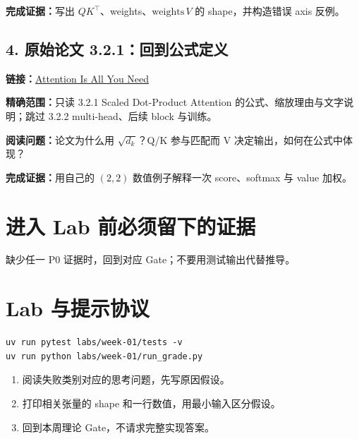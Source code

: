 \documentclass[11pt,a4paper]{article}
\begin{document}
\textbf{完成证据：}写出 $QK^\top$、weights、$\text{weights}\,V$ 的 shape，并构造错误 axis 反例。

\subsection{4. 原始论文 3.2.1：回到公式定义}
\textbf{链接：}\href{https://arxiv.org/abs/1706.03762}{Attention Is All You Need}

\textbf{精确范围：}只读 3.2.1 Scaled Dot-Product Attention 的公式、缩放理由与文字说明；跳过 3.2.2 multi-head、后续 block 与训练。

\textbf{阅读问题：}论文为什么用 $\sqrt{d_k}$？Q/K 参与匹配而 V 决定输出，如何在公式中体现？

\textbf{完成证据：}用自己的 $(2,2)$ 数值例子解释一次 score、softmax 与 value 加权。

\section{进入 Lab 前必须留下的证据}

\begin{itemize}[leftmargin=8mm]
\end{itemize}

缺少任一 P0 证据时，回到对应 Gate；不要用测试输出代替推导。

\section{Lab 与提示协议}

\begin{verbatim}
uv run pytest labs/week-01/tests -v
uv run python labs/week-01/run_grade.py
\end{verbatim}

\begin{enumerate}[label=第 \arabic* 次失败：]
\item 阅读失败类别对应的思考问题，先写原因假设。
\item 打印相关张量的 shape 和一行数值，用最小输入区分假设。
\item 回到本周理论 Gate，不请求完整实现答案。
\end{enumerate}
\end{document}
